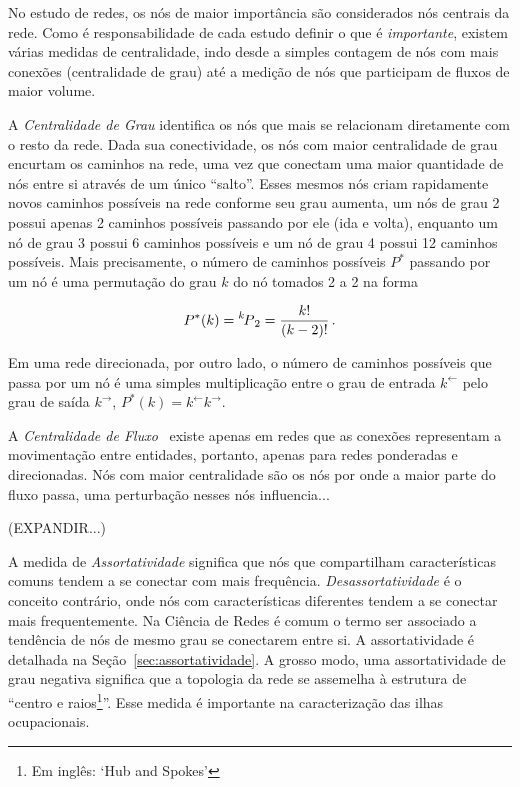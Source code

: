 \documentclass[12pt,a4paper]{article}
\newcommand\Perm[2][^n]{\prescript{#1\mkern-2.5mu}{}P_{#2}}
\begin{document}
No estudo de redes, os nós de maior importância são considerados nós centrais da rede. Como é responsabilidade de cada estudo definir o que é \textit{importante}, existem várias medidas de centralidade, indo desde a simples contagem de nós com mais conexões (centralidade de grau) até a medição de nós que participam de fluxos de maior volume.

A \textit{Centralidade de Grau} identifica os nós que mais se relacionam diretamente com o resto da rede. Dada sua conectividade, os nós com maior centralidade de grau encurtam os caminhos na rede, uma vez que conectam uma maior quantidade de nós entre si através de um único \enquote{salto}. Esses mesmos nós criam rapidamente novos caminhos possíveis na rede conforme seu grau aumenta, um nós de grau 2 possui apenas 2 caminhos possíveis passando por ele (ida e volta), enquanto um nó de grau 3 possui 6 caminhos possíveis e um nó de grau 4 possui 12 caminhos possíveis. Mais precisamente, o número de caminhos possíveis $P^*$ passando por um nó é uma permutação do grau $k$ do nó tomados 2 a 2 na forma

\begin{equation*}
P^*(k) = \Perm[k]{2} = \frac{k!}{(k - 2)!}\,.
\end{equation*}

Em uma rede direcionada, por outro lado, o número de caminhos possíveis que passa por um nó é uma simples multiplicação entre o grau de entrada $k^\leftarrow$ pelo grau de saída $k^\rightarrow$, $P^*(k) = k^\leftarrow k^\rightarrow$.

A \textit{Centralidade de Fluxo}~\cite{Freeman1991-on} existe apenas em redes que as conexões representam a movimentação entre entidades, portanto, apenas para redes ponderadas e direcionadas. Nós com maior centralidade são os nós por onde a maior parte do fluxo passa, uma perturbação nesses nós influencia...

(EXPANDIR...)

A medida de \textit{Assortatividade} significa que nós que compartilham características comuns tendem a se conectar com mais frequência. \textit{Desassortatividade} é o conceito contrário, onde nós com características diferentes tendem a se conectar mais frequentemente. Na Ciência de Redes é comum o termo ser associado a tendência de nós de mesmo grau se conectarem entre si. A assortatividade é detalhada na Seção~\ref{sec:assortatividade}. A grosso modo, uma assortatividade de grau negativa significa que a topologia da rede se assemelha à estrutura de \enquote{centro e raios\footnote{Em inglês: \enquote{Hub and Spokes}}}. Esse medida é importante na caracterização das ilhas ocupacionais.
\end{document}
